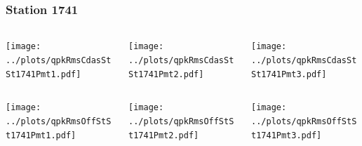 \documentclass[aspectratio=169]{beamer}
\begin{document}
\begin{frame} 
  \frametitle{Station 1741}
  \begin{center}
    \begin{columns}
      \begin{column}{0.33\textwidth}
        \texttt{[image: ../plots/qpkRmsCdasStSt1741Pmt1.pdf]}
      \end{column}
      \begin{column}{0.33\textwidth}
        \texttt{[image: ../plots/qpkRmsCdasStSt1741Pmt2.pdf]}
      \end{column}
      \begin{column}{0.33\textwidth}
        \texttt{[image: ../plots/qpkRmsCdasStSt1741Pmt3.pdf]}
      \end{column}
    \end{columns}
  \end{center}

  \begin{center}
    \begin{columns}
      \begin{column}{0.33\textwidth}
        \texttt{[image: ../plots/qpkRmsOffStSt1741Pmt1.pdf]}
      \end{column}
      \begin{column}{0.33\textwidth}
        \texttt{[image: ../plots/qpkRmsOffStSt1741Pmt2.pdf]}
      \end{column}
      \begin{column}{0.33\textwidth}
        \texttt{[image: ../plots/qpkRmsOffStSt1741Pmt3.pdf]}
      \end{column}
    \end{columns}
  \end{center}
\end{frame}
\end{document}

